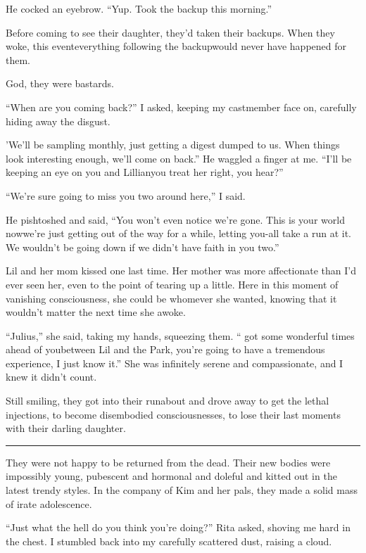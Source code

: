 He cocked an eyebrow. “Yup. Took the backup this morning.”

Before coming to see their daughter, they'd taken their backups.
When they woke, this event{\dash}everything following the backup{\dash}would
never have happened for them.

God, they were bastards.

“When are you coming back?” I asked, keeping my castmember face on,
carefully hiding away the disgust.

'We'll be sampling monthly, just getting a digest dumped to us.
When things look interesting enough, we'll come on back.” He
waggled a finger at me. “I'll be keeping an eye on you and
Lillian{\dash}you treat her right, you hear?”

“We're sure going to miss you two around here,” I said.

He pishtoshed and said, “You won't even notice we're gone. This is
your world now{\dash}we're just getting out of the way for a while,
letting you-all take a run at it. We wouldn't be going down if we
didn't have faith in you two.”

Lil and her mom kissed one last time. Her mother was more
affectionate than I'd ever seen her, even to the point of tearing
up a little. Here in this moment of vanishing consciousness, she
could be whomever she wanted, knowing that it wouldn't matter the
next time she awoke.

“Julius,” she said, taking my hands, squeezing them. 
“ got
some wonderful times ahead of you{\dash}between Lil and the Park, you're
going to have a tremendous experience, I just know it.” She was
infinitely serene and compassionate, and I knew it didn't count.

Still smiling, they got into their runabout and drove away to get
the lethal injections, to become disembodied consciousnesses, to
lose their last moments with their darling daughter.

\begin{center}\rule{1in}{0.4pt}\end{center}

They were not happy to be returned from the dead. Their new bodies
were impossibly young, pubescent and hormonal and doleful and
kitted out in the latest trendy styles. In the company of Kim and
her pals, they made a solid mass of irate adolescence.

“Just what the hell do you think you're doing?” Rita asked, shoving
me hard in the chest. I stumbled back into my carefully scattered
dust, raising a cloud.

